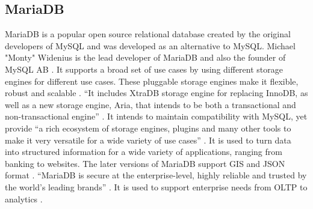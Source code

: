 \subsection{MariaDB}
 
MariaDB is a popular open source relational database created by the original developers of MySQL and was developed as an alternative to MySQL. Michael "Monty" Widenius is the lead developer of MariaDB and also the founder of MySQL AB \cite{wiki-MariaDB}. It supports a broad set of use cases by using different storage engines for different use cases. These pluggable storage engines make it flexible, robust and scalable \cite{mariadb-server}. “It includes XtraDB storage engine for replacing InnoDB, as well as a new storage engine, Aria, that intends to be both a transactional and non-transactional engine” \cite{wiki-MariaDB}. It intends to maintain compatibility with MySQL\cite{wiki-MariaDB}, yet provide “a rich ecosystem of storage engines, plugins and many other tools to make it very versatile for a wide variety of use cases” \cite{www-mariadb-org}. It is used to turn data into structured information for a wide variety of applications, ranging from banking to websites. The later versions of MariaDB support GIS and JSON format \cite{www-mariabdb-org}. “MariaDB is secure at the enterprise-level, highly reliable and trusted by the world’s leading brands” \cite{about-mariadb}. It is used to support enterprise needs from OLTP to analytics \cite{about-mariadb}. 
 


